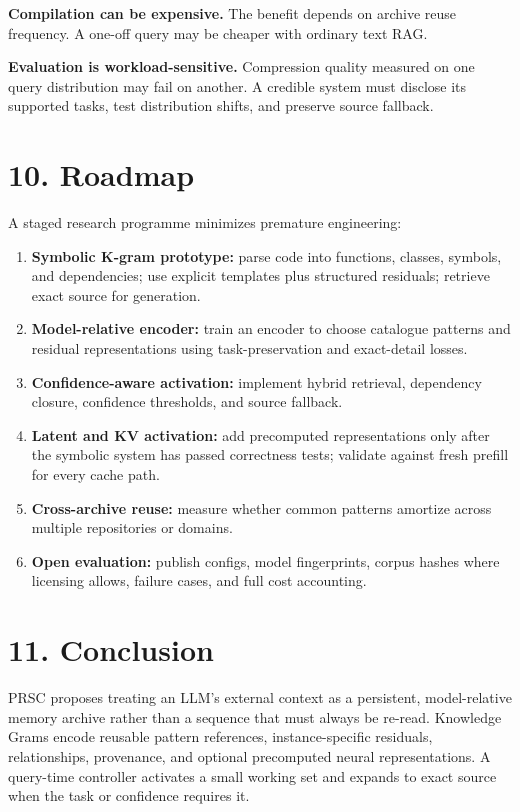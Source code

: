 \documentclass[
  10pt,
]{article}
\providecommand{\tightlist}{%
  \setlength{\itemsep}{0pt}\setlength{\parskip}{0pt}}
\begin{document}
\textbf{Compilation can be expensive.} The benefit depends on archive
reuse frequency. A one-off query may be cheaper with ordinary text RAG.

\textbf{Evaluation is workload-sensitive.} Compression quality measured
on one query distribution may fail on another. A credible system must
disclose its supported tasks, test distribution shifts, and preserve
source fallback.

\section{10. Roadmap}\label{roadmap}

A staged research programme minimizes premature engineering:

\begin{enumerate}
\def\labelenumi{\arabic{enumi}.}
\tightlist
\item
  \textbf{Symbolic K-gram prototype:} parse code into functions,
  classes, symbols, and dependencies; use explicit templates plus
  structured residuals; retrieve exact source for generation.
\item
  \textbf{Model-relative encoder:} train an encoder to choose catalogue
  patterns and residual representations using task-preservation and
  exact-detail losses.
\item
  \textbf{Confidence-aware activation:} implement hybrid retrieval,
  dependency closure, confidence thresholds, and source fallback.
\item
  \textbf{Latent and KV activation:} add precomputed representations
  only after the symbolic system has passed correctness tests; validate
  against fresh prefill for every cache path.
\item
  \textbf{Cross-archive reuse:} measure whether common patterns amortize
  across multiple repositories or domains.
\item
  \textbf{Open evaluation:} publish configs, model fingerprints, corpus
  hashes where licensing allows, failure cases, and full cost
  accounting.
\end{enumerate}

\section{11. Conclusion}\label{conclusion}

PRSC proposes treating an LLM's external context as a persistent,
model-relative memory archive rather than a sequence that must always be
re-read. Knowledge Grams encode reusable pattern references,
instance-specific residuals, relationships, provenance, and optional
precomputed neural representations. A query-time controller activates a
small working set and expands to exact source when the task or
confidence requires it.
\end{document}
